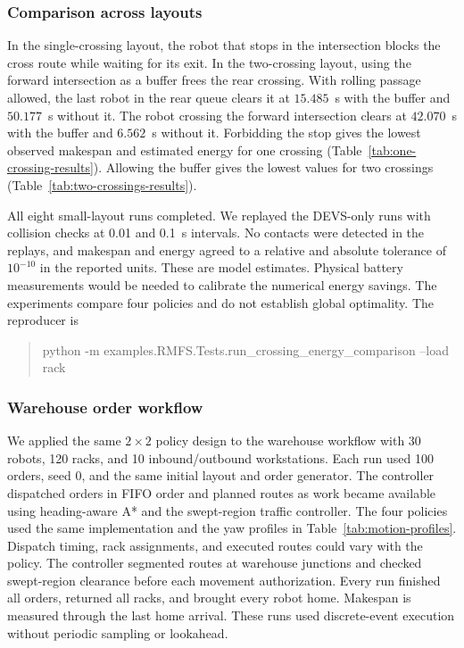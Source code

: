 \documentclass[11pt,a4paper]{article}
\begin{document}
\subsubsection{Comparison across layouts}
In the single-crossing layout, the robot that stops in the intersection
blocks the cross route while waiting for its exit. In the two-crossing
layout, using the forward intersection as a buffer frees the rear crossing.
With rolling passage allowed, the last robot in the rear queue clears it at $15.485$~s
with the buffer and $50.177$~s without it. The robot crossing the forward
intersection clears at $42.070$~s with the buffer and $6.562$~s without it.
Forbidding the stop gives the lowest observed makespan and estimated energy
for one crossing (Table~\ref{tab:one-crossing-results}). Allowing the buffer
gives the lowest values for two crossings (Table~\ref{tab:two-crossings-results}).

All eight small-layout runs completed. We replayed the DEVS-only runs with
collision checks at 0.01 and 0.1~s intervals. No contacts were detected in the
replays, and makespan and energy agreed to a relative and absolute tolerance
of $10^{-10}$ in the reported units. These are model estimates. Physical
battery measurements would be needed to calibrate the numerical energy
savings. The experiments compare four policies and do not establish global
optimality. The reproducer is
\begin{quote}\small\ttfamily
python -m examples.RMFS.Tests.run\_crossing\_energy\_comparison --load rack
\end{quote}

\clearpage
\subsubsection{Warehouse order workflow}
We applied the same $2\times2$ policy design to the warehouse workflow with
30 robots, 120 racks, and 10 inbound/outbound workstations. Each run used
100 orders, seed 0, and the same initial layout and
order generator. The controller dispatched orders in FIFO order and planned
routes as work became available using heading-aware A* and the swept-region
traffic controller. The four policies used the same implementation and the
yaw profiles in Table~\ref{tab:motion-profiles}.
Dispatch timing, rack assignments, and
executed routes could vary with the policy. The controller segmented routes
at warehouse junctions and checked swept-region clearance before each
movement authorization. Every run finished all orders, returned all racks,
and brought every robot home. Makespan is measured through the last home
arrival. These runs used discrete-event execution without periodic sampling
or lookahead.
\end{document}
